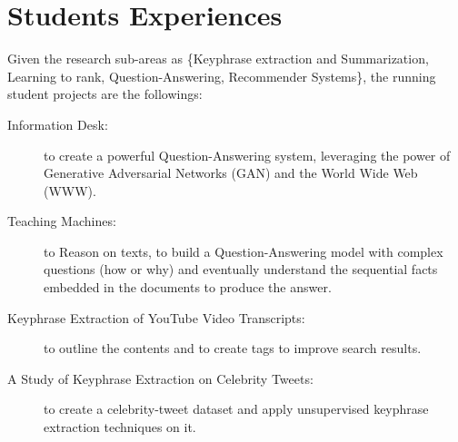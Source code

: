 \documentclass{article}
\begin{document}
\section{Students Experiences}
\label{stuexp}
Given the research sub-areas as \{Keyphrase extraction and Summarization, Learning to rank, Question-Answering, Recommender Systems\}, the running student projects are the followings:
\begin{mdframed}[style=MyFrame, frametitle={Student Projects}]
\begin{description}
\item [Information Desk:] to create a powerful Question-Answering system, leveraging the power of Generative Adversarial Networks (GAN) and the World Wide Web (WWW).

\item [Teaching Machines:] to Reason on texts, to build a Question-Answering model with complex questions (how or why) and eventually understand the sequential facts embedded in the documents to produce the answer.

\item [Keyphrase Extraction of YouTube Video Transcripts:] to outline the contents and to create tags to improve search results.

\item [A Study of Keyphrase Extraction on Celebrity Tweets:]  to create a celebrity-tweet dataset and apply unsupervised keyphrase extraction techniques on it. 
\end{description}
\end{mdframed}
\end{document}
